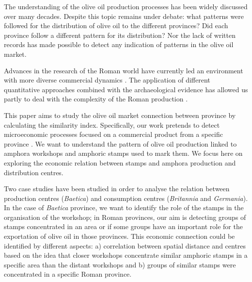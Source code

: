 \documentclass[review]{elsarticle}
\newcommand{\memo}[2]{\textcolor{#1}{#2}}
\newcommand{\xavi}[1]{\memo{magenta}{XRC: #1\\}}
\begin{document}
The understanding of the olive oil production processes has been widely discussed over many decades\citep{rodriguez_economioleicola_1977, Chic_hispania_1997,millet_anforas_1998}. Despite this topic remains under debate: what patterns were followed for the distribution of olive oil to the different provinces?
Did each province follow a different pattern for its distribution? Nor the lack of written records has made possible to detect any indication of patterns in the olive oil market.

Advances in the research of the Roman world have currently led an environment with more diverse commercial dynamics \citep{duncan1982economy,
temin_economy_2006,
quantifyingwilson2009}. The application of different quantitative approaches combined with the archaeological evidence has allowed us partly to deal with the complexity of the Roman production \citep{brughmans_roman_2016,
orengo_seeds_2016,bayesian_2018,
coto-sarmiento_identifying_2018,
rubio-campillo_ecology_2018}.


This paper aims to study the olive oil market connection between province by calculating the similarity index. Specifically, our work pretends to detect microeconomic processes focused on a commercial product from a specific province \citep{isaksen_network_2006}. We want to understand the pattern of olive oil production linked to amphora workshops and amphoric stamps used to mark them. We focus here on exploring the economic relation between stamps and amphora production and distribution centres. 

Two case studies have been studied in order to analyse the relation between production centres (\textit{Baetica}) and consumption centres (\textit{Britannia} and \textit{Germania}). In the case of \textit{Baetica} province, we want to identify the role of the stamps in the organisation of the workshop; in Roman provinces, our aim is detecting groups of stamps concentrated in an area or if some groups have an important role for the exportation of olive oil in those provinces. This economic connection could be identified by different aspects: a) correlation between spatial distance and centres based on the idea that closer workshops concentrate similar amphoric stamps in a specific area than the distant workshops and b) groups of similar stamps were concentrated in a specific Roman province. 
\end{document}
